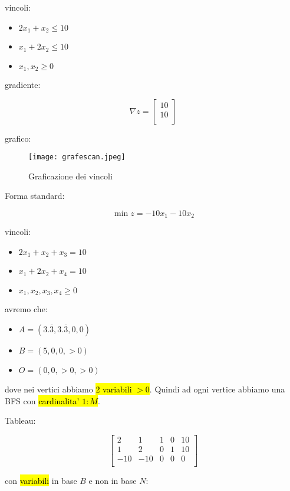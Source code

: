 vincoli:

\begin{itemize}
	\item $2x_1 + x_2 \leq 10$
	\item $x_1 + 2x_2 \leq 10$
	\item $x_1, x_2 \geq 0$
\end{itemize}

gradiente:

$$\nabla z =
\left[ {\begin{array}{c}
	10 \\
	10 \\
\end{array} } \right]
$$

grafico:

\begin{figure}[H]
\centering
\texttt{[image: grafescan.jpeg]}
\caption{Graficazione dei vincoli} 
\label{grafescan}
\end{figure}

Forma standard:

$$\min z = -10x_1 - 10x_2$$

vincoli:

\begin{itemize}
	\item $2x_1 + x_2 + x_3 = 10$
	\item $x_1 + 2x_2 + x_4 = 10$
	\item $x_1, x_2, x_3, x_4 \geq 0$
\end{itemize}

avremo che:

\begin{itemize}
	\item $A = (3.\overline{3}, 3.\overline{3}, 0, 0)$
	\item $B = (5, 0, 0, > 0)$
	\item $O = (0, 0, > 0, > 0)$
\end{itemize}

dove nei vertici abbiamo \hl{2 variabili $> 0$}. Quindi ad ogni vertice abbiamo una BFS con \hl{cardinalita' $1:M$}.

Tableau:

$$
\left[ {\begin{array}{ccccc}
	2 & 1 & 1 & 0 & 10\\
	1 & 2 & 0 & 1 & 10\\
	-10 & -10 & 0 & 0 & 0\\
\end{array} } \right]
$$

con \hl{variabili} in base $B$ e non in base $N$:

